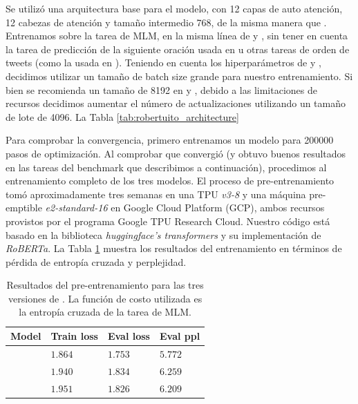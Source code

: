 Se utilizó una arquitectura \roberta{} base para el modelo, con 12 capas de auto atención, 12 cabezas de atención y tamaño intermedio 768, de la misma manera que \bertweet{}. Entrenamos \robertuito{} sobre la tarea de MLM, en la misma línea de \roberta{} y \bertweet{}, sin tener en cuenta la tarea de predicción de la siguiente oración usada en \bert{} u otras tareas de orden de tweets (como la usada en \citet{gonzalez2021twilbert}). Teniendo en cuenta los hiperparámetros de \roberta{} y \bertweet{}, decidimos utilizar un tamaño de batch size grande para nuestro entrenamiento. Si bien se recomienda un tamaño de \num{8192} en \citet{liu2019roberta} y \citet{dat2020bertweet}, debido a las limitaciones de recursos decidimos aumentar el número de actualizaciones utilizando un tamaño de lote de \num{4096}. La Tabla \ref{tab:robertuito_architecture}

Para comprobar la convergencia, primero entrenamos un modelo para \num{200000} pasos de optimización. Al comprobar que convergió (y obtuvo buenos resultados en las tareas del benchmark que describimos a continuación), procedimos al entrenamiento completo de los tres modelos. El proceso de pre-entrenamiento tomó aproximadamente tres semanas en una TPU \emph{v3-8} y una máquina pre-emptible \emph{e2-standard-16} en Google Cloud Platform (GCP), ambos recursos provistos por el programa Google TPU Research Cloud. Nuestro código está basado en la biblioteca \emph{huggingface's transformers} \cite{wolf-etal-2020-transformers} y su implementación de \emph{RoBERTa}. La Tabla \ref{tab:training_results} muestra los resultados del entrenamiento en términos de pérdida de entropía cruzada y perplejidad.

\begin{table}[h]
    \centering
    \begin{tabular}{l l l l}
        Model   & Train loss & Eval loss   & Eval ppl \\
        \hline
        \cased{}   & $1.864$      & $1.753$       & $5.772$    \\
        \uncased{} & $1.940$      & $1.834$       & $6.259$    \\
        \deacc{}   & $1.951$      & $1.826$       & $6.209$    \\
        \hline
    \end{tabular}
    \caption{Resultados del pre-entrenamiento para las tres versiones de \robertuito{}. La función de costo utilizada es la entropía cruzada de la tarea de MLM.}
    \label{tab:training_results}
\end{table}


